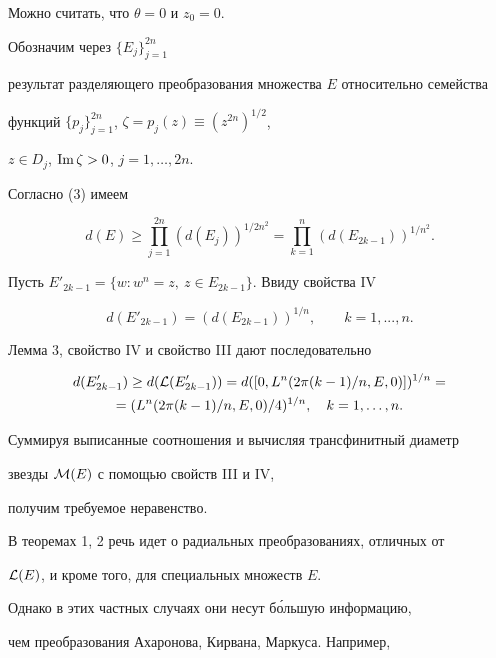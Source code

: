\begin{pf} Можно считать, что $\theta =0$ и $z_0=0$. 


Обозначим через $\{ E_j\} ^{2n}_{j=1}$


результат разделяющего преобразования множества $E$ относительно семейства


функций $\{p_j\}_{j=1}^{2n}$, $\zeta=p_j (z)\equiv(z^{2n})^{1/2}$,


$z\in D_j$, $\operatorname{Im} \zeta >0$, $j=1,\dotsc,2n$.


Согласно (3) имеем


$$


d(E)\geq \prod_{j=1}^{2n}(d(E_j))^{1/2n^2}= 


\prod_{k=1}^{n}(d(E_{2k-1}))^{1/n^2}.


$$ 


Пусть $E'_{2k-1}=\{ w: w^n=z,\ z\in E_{2k-1}\} $. Ввиду свойства IV


$$


d(E'_{2k-1})=(d(E_{2k-1}))^{1/n},\qquad k=1,...,n.


$$


Лемма 3, свойство IV и свойство III дают последовательно


\begin{multline*}


d(E'_{2k-1})\geq d({\cal L} (E'_{2k-1}))=


d([0, L^n(2\pi (k-1)/n, E, 0)])^{1/n}=\\


=(L^n(2\pi (k-1)/n, E, 0)/4)^{1/n},\quad k=1,\dotsc,n.


\end{multline*}


Суммируя выписанные соотношения и вычисляя трансфинитный диаметр 


звезды ${\cal M} (E)$ с помощью свойств III и IV,


получим требуемое неравенство.


\end{pf}





В теоремах 1, 2 речь идет о радиальных преобразованиях, отличных от


${\cal L} (E)$, и кроме того, для специальных множеств $E$.


Однако в этих частных случаях они несут б\'ольшую информацию,


чем преобразования Ахаронова, Кирвана, Маркуса. Например,


